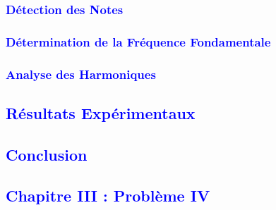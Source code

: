 \documentclass{article}
\begin{document}

\textcolor{blue}{\subsubsection{Détection des Notes}}

\textcolor{blue}{\subsubsection{Détermination de la Fréquence Fondamentale}}

\textcolor{blue}{\subsubsection{Analyse des Harmoniques}}

\newpage
\textcolor{blue}{\subsection{Résultats Expérimentaux}}

\newpage
\textcolor{blue}{\subsection{Conclusion}}

\textcolor{blue}{\section{Chapitre III : Problème IV}}
\end{document}
